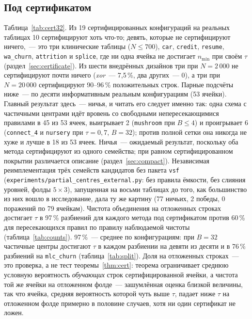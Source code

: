 \documentclass[11pt]{article}
\begin{document}
\subsection{Под сертификатом}\label{sec:certified}
Таблица~\ref{tab:cert32}. Из 19 сертифицированных конфигураций на реальных таблицах 10 сертифицируют хоть что-то; девять, которые не сертифицируют ничего,~--- это три клинические таблицы ($N\le700$), \texttt{car}, \texttt{credit}, \texttt{resume}, \texttt{wa\_churn}, \texttt{attrition} и \texttt{splice}, где ни одна ячейка не достигает $n_{\min}$ при своём $\tau$ (раздел~\ref{sec:certificate}). Из шести внедрённых дизайнов три при $N=2\,000$ не сертифицируют почти ничего (\emph{xor}~--- 7,5\,\%, два других~--- 0), а три при $N=20\,000$ сертифицируют 90--96\,\% положительных строк. Парные подсчёты ниже~--- по десяти информативным реальным конфигурациям (53 ячейки). Главный результат здесь~--- ничья, и читать его следует именно так: одна схема с частичными центрами идёт вровень со свободными непересекающимися правилами в 45 из 53 ячеек, выигрывает 2 (\texttt{mushroom} при $B\le4$) и проигрывает 6 (\texttt{connect\_4} и \texttt{nursery} при $\tau=0{,}7$, $B=32$); против полной сетки она никогда не хуже и лучше в 18 из 53 ячеек. Ничья~--- ожидаемый результат, поскольку оба метода сертифицируют из одного семейства; при равном сертифицированном покрытии различается описание (раздел~\ref{sec:compact}). Независимая реимплементация трёх семейств кандидатов без пакета \texttt{vsf} (\texttt{experiments/partial\_centres\_external.py}: без правила ёмкости, без слияния уровней, фолды $5\times3$), запущенная на восьми таблицах до того, как большинство из них вошло в исследование, дала ту же картину (77 ничьих, 2 победы, 0 поражений по 79 ячейкам). Чистота объединения на отложенных строках достигает $\tau$ в 97\,\% разбиений для каждого метода под сертификатом против 60\,\% для пересекающихся правил по правилу наблюдаемой чистоты (таблица~\ref{tab:counts}). 97\,\%~--- среднее по конфигурациям: при $B=32$ частичные центры достигают $\tau$ в каждом разбиении на девяти из десяти и в 76\,\% разбиений на \texttt{mlc\_churn} (таблица~\ref{tab:split}). Доля на отложенных строках~--- это проверка, а не тест теоремы~\ref{thm:cert}: теорема ограничивает среднюю условную вероятность \emph{обучающих} строк сертифицированной ячейки, а чистота той же ячейки на отложенном фолде~--- зашумлённая оценка близкой величины, так что ячейка, средняя вероятность которой чуть выше $\tau$, падает ниже $\tau$ на отложенном фолде примерно в половине случаев, хотя ни один сертификат не ложен.
\end{document}
